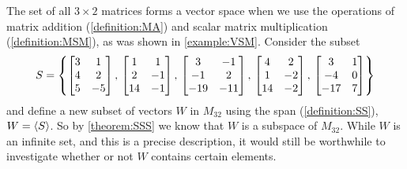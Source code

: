 \documentclass{ximera}
\begin{document}
\begin{example}[A subspace of $M_{32}$]
  The set of all $3\times 2$ matrices forms a vector space when we use
  the operations of matrix addition (\ref{definition:MA}) and scalar
  matrix multiplication (\ref{definition:MSM}), as was shown in
  \ref{example:VSM}.  Consider the subset
  \[
    S=\left\{
      \begin{bmatrix}
        3 & 1 \\ 4 & 2 \\ 5 & -5
      \end{bmatrix},\,
      \begin{bmatrix}
        1 & 1 \\ 2 &-1 \\ 14 & -1
      \end{bmatrix},\,
      \begin{bmatrix}
        3 & -1 \\ -1&2 \\ -19 & -11
      \end{bmatrix},\,
      \begin{bmatrix}
        4 & 2 \\ 1 & -2 \\ 14 & -2
      \end{bmatrix},\,
      \begin{bmatrix}
        3 & 1 \\ -4 & 0 \\ -17 & 7
      \end{bmatrix}
    \right\}
  \]
  and define a new subset of vectors $W$ in $M_{32}$ using the span
  (\ref{definition:SS}), $W=\left\langle S\right\rangle$.  So by \ref{theorem:SSS} we know
  that $W$ is a subspace of $M_{32}$.  While $W$ is an infinite set,
  and this is a precise description, it would still be worthwhile to
  investigate whether or not $W$ contains certain elements.


\end{example}
\end{document}
